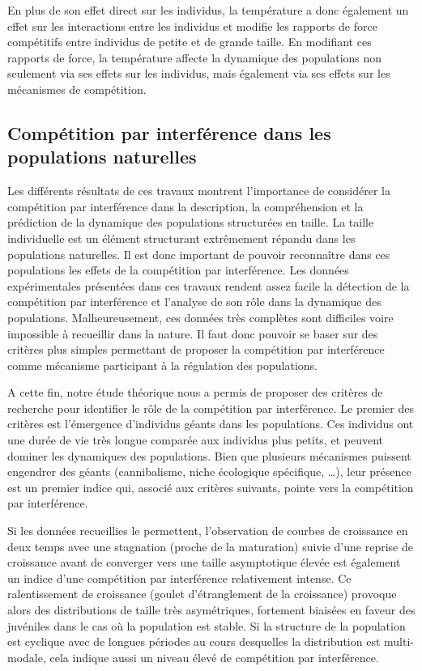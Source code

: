 En plus de son effet direct sur les individus, la température a donc également
un effet sur les interactions entre les individus et modifie les rapports de force
compétitifs entre individus de petite et de grande taille. En modifiant ces
rapports de force, la température affecte la dynamique des populations non
seulement via ses effets sur les individus, mais également via ses effets sur
les mécanismes de compétition.

\subsection{Compétition par interférence dans les populations naturelles}

Les différents résultats de ces travaux montrent l'importance de considérer la
compétition par interférence dans la description, la compréhension et la
prédiction de la dynamique des populations structurées en taille. La taille
individuelle est un élément structurant extrêmement répandu dans les populations
naturelles. Il est donc important de pouvoir reconnaître dans ces populations
les effets de la compétition par interférence. Les données expérimentales
présentées dans ces travaux rendent assez facile la détection de la compétition
par interférence et l'analyse de son rôle dans la dynamique des populations.
Malheureusement, ces données très complètes sont difficiles voire impossible à
recueillir dans la nature. Il faut donc pouvoir se baser sur des critères plus
simples permettant de proposer la compétition par interférence comme mécanisme
participant à la régulation des populations.

A cette fin, notre étude théorique nous a permis de proposer des critères de
recherche pour identifier le rôle de la compétition par interférence. Le premier
des critères est l'émergence d'individus géants dans les populations.
Ces individus ont une durée de vie très longue comparée aux individus plus
petits, et peuvent dominer les dynamiques des populations. Bien que plusieurs
mécanismes puissent engendrer des géants (cannibalisme, niche écologique
spécifique, \ldots), leur présence est un premier indice qui, associé aux
critères suivants, pointe vers la compétition par interférence.

Si les données recueillies le permettent, l'observation de courbes de croissance
en deux temps avec une stagnation (proche de la maturation) suivie d'une reprise
de croissance avant de converger vers une taille asymptotique élevée est
également un indice d'une compétition par interférence relativement intense. Ce
ralentissement de croissance (goulet d'étranglement de la croissance) provoque
alors des distributions de taille très asymétriques, fortement biaisées en
faveur des juvéniles dans le cas où la population est stable. Si la structure de
la population est cyclique avec de longues périodes au cours desquelles la
distribution est multi-modale, cela indique aussi un niveau élevé de compétition par
interférence.

